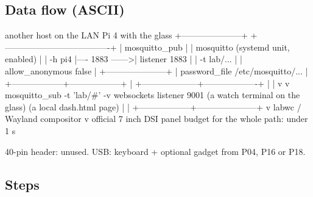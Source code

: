 \subsection*{Data flow (ASCII)}

\begin{asciiart}
  another host on the LAN                 Pi 4 with the glass
  +---------------------+                 +-------------------------------------+
  | mosquitto_pub       |                 |  mosquitto  (systemd unit, enabled) |
  |   -h pi4            |---- 1883 ------>|    listener 1883                    |
  |   -t lab/...        |                 |    allow_anonymous false            |
  +---------------------+                 |    password_file /etc/mosquitto/... |
                                          +------------------+------------------+
                                                             |
                                        +--------------------+-------------------+
                                        |                                        |
                                        v                                        v
                            mosquitto_sub -t 'lab/#' -v          websockets listener 9001
                            (a watch terminal on the glass)      (a local dash.html page)
                                        |                                        |
                                        +------------------+---------------------+
                                                           v
                                              labwc / Wayland compositor
                                                           v
                                              official 7 inch DSI panel
                                              budget for the whole path: under 1 s

  40-pin header: unused.  USB: keyboard + optional gadget from P04, P16 or P18.
\end{asciiart}

\subsection*{Steps}

